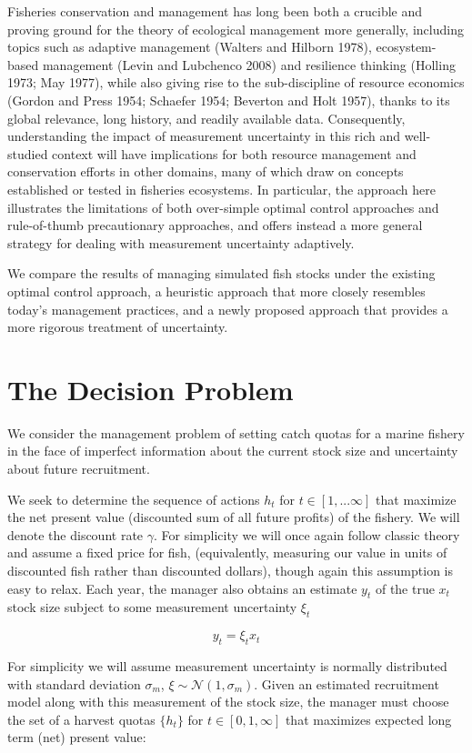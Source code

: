 \documentclass[3p]{elsarticle} %
\begin{document}
Fisheries conservation and management has long been both a crucible and
proving ground for the theory of ecological management more generally,
including topics such as adaptive management (Walters and Hilborn 1978),
ecosystem-based management (Levin and Lubchenco 2008) and resilience
thinking (Holling 1973; May 1977), while also giving rise to the
sub-discipline of resource economics (Gordon and Press 1954; Schaefer
1954; Beverton and Holt 1957), thanks to its global relevance, long
history, and readily available data. Consequently, understanding the
impact of measurement uncertainty in this rich and well-studied context
will have implications for both resource management and conservation
efforts in other domains, many of which draw on concepts established or
tested in fisheries ecosystems. In particular, the approach here
illustrates the limitations of both over-simple optimal control
approaches and rule-of-thumb precautionary approaches, and offers
instead a more general strategy for dealing with measurement uncertainty
adaptively.

We compare the results of managing simulated fish stocks under the
existing optimal control approach, a heuristic approach that more
closely resembles today's management practices, and a newly proposed
approach that provides a more rigorous treatment of uncertainty.

\section{The Decision Problem}\label{the-decision-problem}

We consider the management problem of setting catch quotas for a marine
fishery in the face of imperfect information about the current stock
size and uncertainty about future recruitment.

We seek to determine the sequence of actions \(h_t\) for
\(t \in [1, ... \infty]\) that maximize the net present value
(discounted sum of all future profits) of the fishery. We will denote
the discount rate \(\gamma\). For simplicity we will once again follow
classic theory and assume a fixed price for fish, (equivalently,
measuring our value in units of discounted fish rather than discounted
dollars), though again this assumption is easy to relax. Each year, the
manager also obtains an estimate \(y_t\) of the true \(x_t\) stock size
subject to some measurement uncertainty \(\xi_t\)

\[y_t = \xi_t x_t\]

For simplicity we will assume measurement uncertainty is normally
distributed with standard deviation \(\sigma_m\),
\(\xi \sim \mathcal{N}(1, \sigma_m)\). Given an estimated recruitment
model along with this measurement of the stock size, the manager must
choose the set of a harvest quotas \(\lbrace h_t \rbrace\) for
\(t \in [0, 1, \infty]\) that maximizes expected long term (net) present
value:
\end{document}
